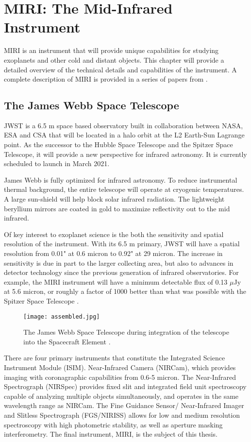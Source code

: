 \chapter{MIRI: The Mid-Infrared Instrument}
MIRI is an instrument that will provide unique capabilities for studying exoplanets and other cold and distant objects. This chapter will provide a detailed overview of the technical details and capabilities of the instrument. A complete description of MIRI is provided in a series of papers from \parencite{MIRI1,MIRI2,MIRI3, MIRI4,MIRI5,MIRI6,MIRI7,MIRI8,MIRI9}.
%
%
\section{The James Webb Space Telescope}
JWST is a 6.5 m space based observatory built in collaboration between NASA, ESA and CSA that will be located in a halo orbit at the L2 Earth-Sun Lagrange point. 
As the successor to the Hubble Space Telescope and the Spitzer Space Telescope, it will provide a new perspective for infrared astronomy. 
It is currently scheduled to launch in March 2021.

James Webb is fully optimized for infrared astronomy. 
To reduce instrumental thermal background, the entire telescope will operate at cryogenic temperatures. 
A large sun-shield will help block solar infrared radiation.
The lightweight beryllium mirrors are coated in gold to maximize reflectivity out to the mid infrared.

Of key interest to exoplanet science is the both the sensitivity and spatial resolution of the instrument. 
With its 6.5 m primary, JWST will have a spatial resolution from 0.01" at 0.6 micron to 0.92" at 29 micron.
The increase in sensitivity is due in part to the larger collecting area, but also to advances in detector technology since the previous generation of infrared observatories.
For example, the MIRI instrument will have a minimum detectable flux of 0.13 $\mu$Jy at 5.6 micron, or roughly a factor of 1000 better than what was possible with the Spitzer Space Telescope \parencite{MIRI9}.
\begin{figure}[t]
	\texttt{[image: assembled.jpg]}
	\caption{The James Webb Space Telescope during integration of the telescope into the Spacecraft Element \parencite{assembled}. }
	\label{fig:jwst}
\end{figure}

There are four primary instruments that constitute the Integrated Science Instrument Module (ISIM). 
Near-Infrared Camera (NIRCam), which provides imaging with coronagraphic capabilities from 0.6-5 micron.
The Near-Infrared Spectrograph (NIRSpec) provides fixed slit and integrated field unit spectroscopy capable of analyzing multiple objects simultaneously, and operates in the same wavelength range as NIRCam.
The Fine Guidance Sensor/ Near-Infrared Imager and Slitless Spectrograph (FGS/NIRISS) allows for low and medium resolution spectroscopy with high photometric stability, as well as aperture masking interferometry. 
The final instrument, MIRI, is the subject of this thesis.

